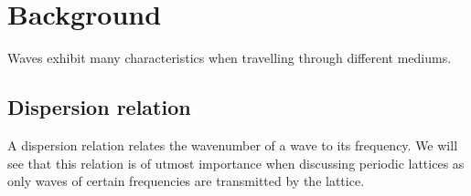 \chapter{Background}
Waves exhibit many characteristics when travelling through different mediums. 

\section{Dispersion relation}
A dispersion relation relates the wavenumber of a wave to its frequency. We
will see that this relation is of utmost importance when discussing periodic
lattices as only waves of certain frequencies are transmitted by the lattice.

